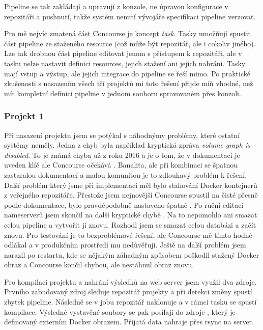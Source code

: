         Pipeline se tak zakládají a upravují z konzole, ne úpravou konfigurace v repozitáři a pushnutí, takže systém nenutí vývojáře specifikaci pipeline verzovat.

        Pro mě nejvíc zmatená část Concourse je koncept \textit{task}. Tasky umožňují spustit část pipeline ze staženého resource (což může být repozitář, ale i cokoliv jiného). Lze tak drobnou část pipeline editovat jenom s přístupem k repozitáři, ale v tasku nelze nastavit definici resources, jejich stažení ani jejich nahrání. Tasky mají vstup a výstup, ale jejich integrace do pipeline se řeší mimo. Po praktické zkušenosti s nasazením všech tří projektů mi toto řešení přijde míň vhodné, než mít kompletní definici pipeline v jednom souboru spravovaném přes konzoli.


        \subsubsection{Projekt 1}
            Při nasazení projektu jsem se potýkal s náhodnýmy problémy, které ostatní \CI systémy neměly. Jedna z chyb byla například kryptická zpráva \textit{volume graph is disabled}. To je známá chyba už z roku 2016 a je o tom, že v dokumentaci je uveden klíč  ale Concourse očekává  \cite{concourse-issue-402}. Banalita, ale při kombinaci se špatnou zastaralou dokumentací a malou komunitou je to zdlouhavý problém k řešení. Další problém který jsme při implementaci měl bylo stahování Docker kontejnerů z veřejného repozitáře. Přestože jsem nejnovější Concourse spustil na čisté  přesně podle dokumentace, bylo pravděpodobně nastaveno špatně . Po ruční editaci nameserverů jsem skončil na další kryptické chybě . Na to nepomohlo ani smazat celou pipeline a vytvořit ji znovu. Rozhodl jsem se smazat celou databázi a začít znovu. Pro testování je to bezproblémové řešení, ale Concourse mě tímto hodně odlákal a v produkčním prostředí mu nedůvěřuji. Ještě na další problém jsem narazil po restartu, kde se nějakým záhadným způsobem poškodil stažený Docker obraz a Concourse končil chybou, ale nestáhnul obraz znovu.

            Pro kompilaci projektu a nahrání výsledků na web server jsem využil dva zdroje. Prvního zabudovaný zdroj  sleduje repozitář projekty a při detekci změny spustí zbytek pipeline. Následně se v jobu repozitář naklonuje a v rámci tasku se spustí kompilace. Výsledné vystavěné soubory se pak posílají do zdroje , který je definovaný externím Docker obrazem. Přijatá data nahraje přes rsync na server.

